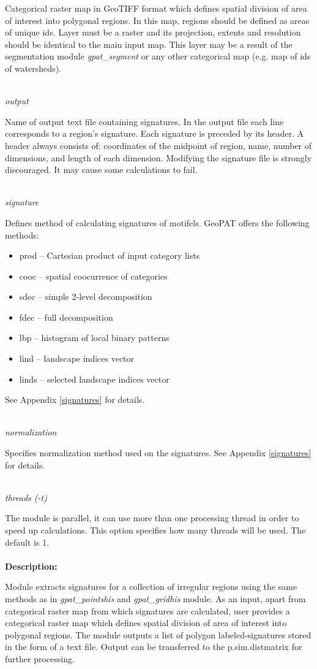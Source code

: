 \documentclass[12pt,margin=0.5in]{article}
\newcommand{\newoption}[1]{\mbox{}\\{\it #1}}
\begin{document}
Categorical raster map in GeoTIFF format which defines spatial division of area of interest into polygonal regions. In this map, regions should be defined as areas of unique ids. Layer must be a raster and its projection, extents and resolution should be identical to the main input map. This layer may be a result of the segmentation module {\it gpat\_segment} or any other categorical map (e.g. map of ids of watersheds).

\newoption{output}

Name of output text file containing signatures. In the output file each line corresponds to a region's signature. Each signature is preceded by its header. A header always consists of: coordinates of the midpoint of region, name, number of dimensions, and length of each dimension. Modifying the signature file is strongly discouraged. It may cause some calculations to fail.

\newoption{signature}

Defines method of calculating signatures of motifels. GeoPAT offers the following methods: 
\begin{itemize}
	\item prod -- Cartesian product of input category lists
	\item cooc -- spatial coocurrence of categories
	\item sdec -- simple 2-level decomposition
	\item fdec -- full decomposition
	\item lbp -- histogram of local binary patterns
	\item lind -- landscape indices vector
	\item linds -- selected landscape indices vector
\end{itemize}
See Appendix \ref{signatures} for details.

\newoption{normalization}

Specifies normalization method used on the signatures. See Appendix \ref{signatures} for details.

\newoption{threads (-t)}

The module is parallel, it can use more than one processing thread in order to speed up calculations. This option specifies how many threads will be used. The default is 1.
\\\\
{\bf Description:}

Module extracts signatures for a collection of irregular regions using the same methods as in {\it gpat\_pointshis} and {\it gpat\_gridhis} module. As an input, apart from categorical raster map from which signatures are calculated, user provides a categorical raster map which defines spatial division of area of interest into polygonal regions. The module outputs a list of polygon labeled-signatures stored in the form of a text file. Output can be transferred to the p.sim.distmatrix for further processing.
\end{document}
